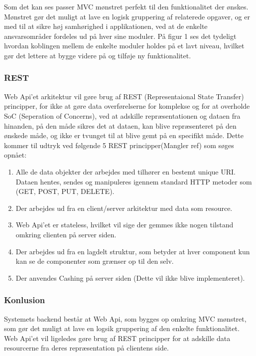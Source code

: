 Som det kan ses passer MVC mønstret perfekt til den funktionalitet der ønskes. Mønstret gør det muligt at lave en logisk gruppering af relaterede opgaver, og er med til at sikre høj samhørighed i applikationen, ved at de enkelte ansvarsområder fordeles ud på hver sine moduler. På figur 1 ses det tydeligt hvordan koblingen mellem de enkelte moduler holdes på et lavt niveau, hvilket gør det lettere at bygge videre på og tilføje ny funktionalitet.



\subsubsection{REST}
Web Api’et arkitektur vil gøre brug af REST (Representaional State Transfer) principper, for ikke at gøre data overførelserne for komplekse og for at overholde SoC (Seperation of Concerns), ved at adskille repræsentationen og dataen fra hinanden, på den måde sikres det at dataen, kan blive repræsenteret på den ønskede måde, og ikke er tvunget til at blive gemt på en specifikt måde.
Dette kommer til udtryk ved følgende 5 REST principper(Mangler ref)  som søges opnået:
\begin{enumerate}
 \item Alle de data objekter der arbejdes med tilhører en bestemt unique URI. Dataen hentes, sendes og manipuleres igennem standard HTTP metoder som (GET, POST, PUT, DELETE).
 \item Der arbejdes ud fra en client/server arkitektur med data som resource. 
 \item Web Api’et er stateless, hvilket vil sige der gemmes ikke nogen tilstand omkring clienten på server siden.
 \item Der arbejdes ud fra en lagdelt struktur, som betyder at hver component kun kan se de componenter som grænser op til den selv.
 \item Der anvendes Cashing på server siden (Dette vil ikke blive implementeret).
\end{enumerate}

\subsubsection{Konlusion}

Systemets backend består at Web Api, som bygges op omkring MVC mønstret, som gør det muligt at lave en logsik gruppering af den enkelte funktionalitet. Web Api’et vil ligeledes gøre brug af REST principper for at adskille data resourcerne fra deres repræsentation på clientens side.

\newpage
